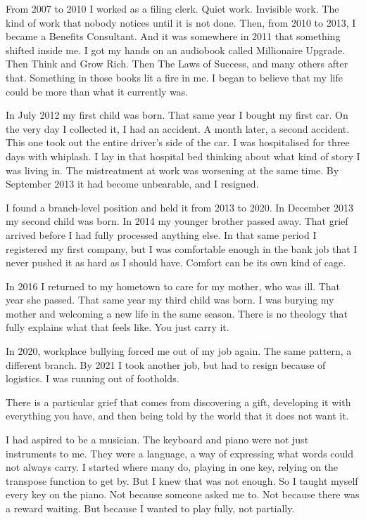 From 2007 to 2010 I worked as a filing clerk. Quiet work. Invisible
work. The kind of work that nobody notices until it is not done. Then,
from 2010 to 2013, I became a Benefits Consultant. And it was somewhere
in 2011 that something shifted inside me. I got my hands on an audiobook
called Millionaire Upgrade. Then Think and Grow Rich. Then The Laws of
Success, and many others after that. Something in those books lit a fire
in me. I began to believe that my life could be more than what it
currently was.

In July 2012 my first child was born. That same year I bought my first
car. On the very day I collected it, I had an accident. A month later, a
second accident. This one took out the entire driver's side of the car.
I was hospitalised for three days with whiplash. I lay in that hospital
bed thinking about what kind of story I was living in. The mistreatment
at work was worsening at the same time. By September 2013 it had become
unbearable, and I resigned.

I found a branch-level position and held it from 2013 to 2020. In
December 2013 my second child was born. In 2014 my younger brother
passed away. That grief arrived before I had fully processed anything
else. In that same period I registered my first company, but I was
comfortable enough in the bank job that I never pushed it as hard as I
should have. Comfort can be its own kind of cage.

In 2016 I returned to my hometown to care for my mother, who was ill.
That year she passed. That same year my third child was born. I was
burying my mother and welcoming a new life in the same season. There is
no theology that fully explains what that feels like. You just carry it.

In 2020, workplace bullying forced me out of my job again. The same
pattern, a different branch. By 2021 I took another job, but had to
resign because of logistics. I was running out of footholds.

There is a particular grief that comes from discovering a gift,
developing it with everything you have, and then being told by the world
that it does not want it.

I had aspired to be a musician. The keyboard and piano were not just
instruments to me. They were a language, a way of expressing what words
could not always carry. I started where many do, playing in one key,
relying on the transpose function to get by. But I knew that was not
enough. So I taught myself every key on the piano. Not because someone
asked me to. Not because there was a reward waiting. But because I
wanted to play fully, not partially.

